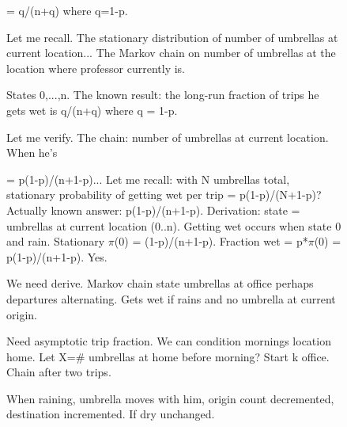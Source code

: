 \begin{figure}[t]
\noindent
\begin{reasoncol}[equal height group=reasX0]
  \par\vspace{1pt}
  \caret{}\par\vspace{4pt}
  \raggedright {}   = q/(n+q) where q=1-p.\par
  Let me recall. The stationary distribution of number of umbrellas at current location... The Markov chain on number of umbrellas at the location where professor currently is.\par
  States 0,...,n. The known result: the long-run fraction of trips he gets wet is q/(n+q) where q = 1-p.\par
  Let me verify. The chain: number of umbrellas at current location. When he's\par\vspace{3pt}\elide
\end{reasoncol}\hspace{\columnsep}%
\begin{reasoncol}[equal height group=reasX0]
  \par\vspace{1pt}
  \caret{}\par\vspace{4pt}
  \raggedright {}   = p(1-p)/(n+1-p)... Let me recall: with N umbrellas total, stationary probability of getting wet per trip = p(1-p)/(N+1-p)? Actually known answer: p(1-p)/(n+1-p). Derivation: state = umbrellas at current location (0..n). Getting wet occurs when state 0 and rain. Stationary \(\pi\)(0) = (1-p)/(n+1-p). Fraction wet = p*\(\pi\)(0) = p(1-p)/(n+1-p). Yes.\par\vspace{3pt}\elide
\end{reasoncol}\hspace{\columnsep}%
\begin{reasoncol}[equal height group=reasX0]
  \par\vspace{1pt}
  \caret{}\par\vspace{4pt}
  \raggedright We need derive. Markov chain state umbrellas at office perhaps departures alternating. Gets wet if rains and no umbrella at current origin.\par
  Need asymptotic trip fraction. We can condition mornings location home. Let X=\# umbrellas at home before morning? Start k office. Chain after two trips.\par
  When raining, umbrella moves with him, origin count decremented, destination incremented. If dry unchanged.\par\vspace{3pt}\elide
\end{reasoncol}


\end{figure}
